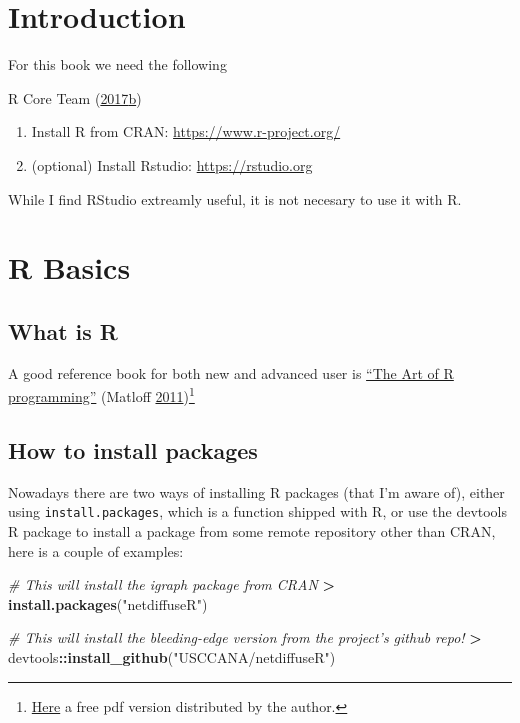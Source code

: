 \documentclass[]{book}
\newenvironment{Shaded}{\begin{snugshade}}{\end{snugshade}}
\newcommand{\KeywordTok}[1]{\textcolor[rgb]{0.13,0.29,0.53}{\textbf{#1}}}
\newcommand{\StringTok}[1]{\textcolor[rgb]{0.31,0.60,0.02}{#1}}
\newcommand{\CommentTok}[1]{\textcolor[rgb]{0.56,0.35,0.01}{\textit{#1}}}
\newcommand{\OperatorTok}[1]{\textcolor[rgb]{0.81,0.36,0.00}{\textbf{#1}}}
\newcommand{\NormalTok}[1]{#1}
\let\rmarkdownfootnote\footnote%
\def\footnote{\protect\rmarkdownfootnote}
\theoremstyle{definition}
\theoremstyle{definition}
\theoremstyle{definition}
\theoremstyle{remark}
\begin{document}
\chapter{Introduction}\label{introduction}

For this book we need the following

R Core Team
(\protect\hyperlink{ref-R}{2017}\protect\hyperlink{ref-R}{b})

\begin{enumerate}
\def\labelenumi{\arabic{enumi}.}
\item
  Install R from CRAN: \url{https://www.r-project.org/}
\item
  (optional) Install Rstudio: \url{https://rstudio.org}
\end{enumerate}

While I find RStudio extreamly useful, it is not necesary to use it with
R.

\chapter{R Basics}\label{r-basics}

\section{What is R}\label{what-is-r}

A good reference book for both new and advanced user is
\href{https://nostarch.com/artofr.htm}{``The Art of R programming''}
(Matloff \protect\hyperlink{ref-Matloff2011}{2011})\footnote{\href{http://heather.cs.ucdavis.edu/~matloff/145/PLN/RMaterials/NSPpart.pdf}{Here}
  a free pdf version distributed by the author.}

\section{How to install packages}\label{how-to-install-packages}

Nowadays there are two ways of installing R packages (that I'm aware
of), either using \texttt{install.packages}, which is a function shipped
with R, or use the devtools R package to install a package from some
remote repository other than CRAN, here is a couple of examples:

\begin{Shaded}
\begin{Highlighting}[]
\CommentTok{# This will install the igraph package from CRAN}
\OperatorTok{>}\StringTok{ }\KeywordTok{install.packages}\NormalTok{(}\StringTok{"netdiffuseR"}\NormalTok{)}

\CommentTok{# This will install the bleeding-edge version from the project's github repo!}
\OperatorTok{>}\StringTok{ }\NormalTok{devtools}\OperatorTok{::}\KeywordTok{install_github}\NormalTok{(}\StringTok{"USCCANA/netdiffuseR"}\NormalTok{)}
\end{Highlighting}
\end{Shaded}
\end{document}
